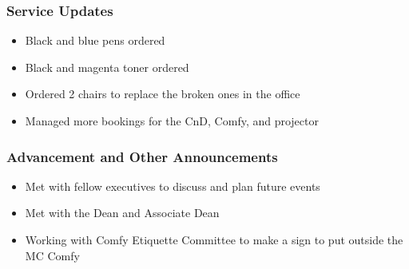 \subsubsection*{Service Updates}
\begin{itemize}
	\item Black and blue pens ordered
	\item Black and magenta toner ordered
	\item Ordered 2 chairs to replace the broken ones in the office
	\item Managed more bookings for the CnD, Comfy, and projector
\end{itemize}

\subsubsection*{Advancement and Other Announcements}
\begin{itemize}
	\item Met with fellow executives to discuss and plan future events
	\item Met with the Dean and Associate Dean
	\item Working with Comfy Etiquette Committee to make a sign to put outside the MC Comfy
\end{itemize}